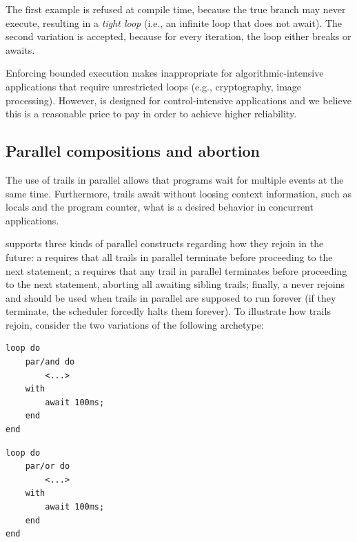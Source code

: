 The first example is refused at compile time, because the  true branch 
may never execute, resulting in a \emph{tight loop} (i.e., an infinite loop 
that does not await).
The second variation is accepted, because for every iteration, the loop either 
breaks or awaits.

Enforcing bounded execution makes \CEU inappropriate for algorithmic-intensive 
applications that require unrestricted loops (e.g., cryptography, image 
processing).
However, \CEU is designed for control-intensive applications and we believe 
this is a reasonable price to pay in order to achieve higher reliability.

\subsection{Parallel compositions and abortion}
\label{sec.ceu.par}

The use of trails in parallel allows that programs wait for multiple events at 
the same time.
Furthermore, trails await without loosing context information, such as locals 
and the program counter, what is a desired behavior in concurrent 
applications.~\cite{sync_async.cooperative}

\CEU supports three kinds of parallel constructs regarding how they rejoin in 
the future:
a  requires that all trails in parallel terminate before 
proceeding to the next statement;
a  requires that any trail in parallel terminates before 
proceeding to the next statement, aborting all awaiting sibling trails;
finally, a  never rejoins and should be used when trails in parallel 
are supposed to run forever (if they terminate, the scheduler forcedly halts 
them forever).
%
To illustrate how trails rejoin, consider the two variations of the following 
archetype:

\begin{minipage}[t]{0.40\linewidth}
\begin{lstlisting}
loop do
    par/and do
        <...>
    with
        await 100ms;
    end
end
\end{lstlisting}
\end{minipage}
%
\begin{minipage}[t]{0.40\linewidth}
\begin{lstlisting}
loop do
    par/or do
        <...>
    with
        await 100ms;
    end
end
\end{lstlisting}
\end{minipage}

